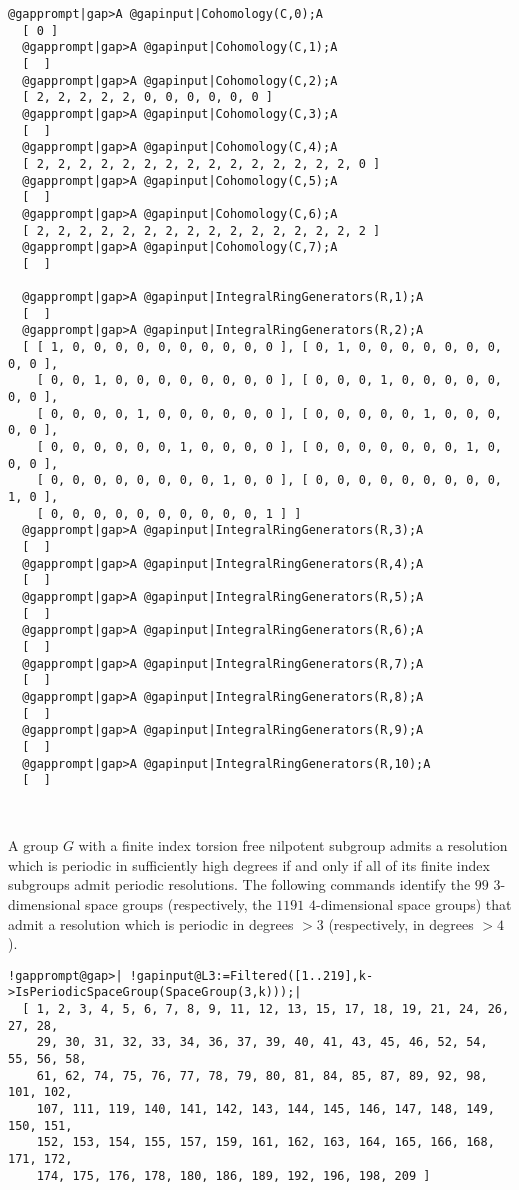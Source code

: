 \documentclass[a4paper,11pt]{report}
\begin{document}
{{\begin{Verbatim}[commandchars=@|A,fontsize=\small,frame=single,label=Example]
  @gapprompt|gap>A @gapinput|Cohomology(C,0);A
  [ 0 ]
  @gapprompt|gap>A @gapinput|Cohomology(C,1);A
  [  ]
  @gapprompt|gap>A @gapinput|Cohomology(C,2);A
  [ 2, 2, 2, 2, 2, 0, 0, 0, 0, 0, 0 ]
  @gapprompt|gap>A @gapinput|Cohomology(C,3);A
  [  ]
  @gapprompt|gap>A @gapinput|Cohomology(C,4);A
  [ 2, 2, 2, 2, 2, 2, 2, 2, 2, 2, 2, 2, 2, 2, 2, 0 ]
  @gapprompt|gap>A @gapinput|Cohomology(C,5);A
  [  ]
  @gapprompt|gap>A @gapinput|Cohomology(C,6);A
  [ 2, 2, 2, 2, 2, 2, 2, 2, 2, 2, 2, 2, 2, 2, 2, 2 ]
  @gapprompt|gap>A @gapinput|Cohomology(C,7);A
  [  ]
  
  @gapprompt|gap>A @gapinput|IntegralRingGenerators(R,1);A
  [  ]
  @gapprompt|gap>A @gapinput|IntegralRingGenerators(R,2);A
  [ [ 1, 0, 0, 0, 0, 0, 0, 0, 0, 0, 0 ], [ 0, 1, 0, 0, 0, 0, 0, 0, 0, 0, 0 ], 
    [ 0, 0, 1, 0, 0, 0, 0, 0, 0, 0, 0 ], [ 0, 0, 0, 1, 0, 0, 0, 0, 0, 0, 0 ], 
    [ 0, 0, 0, 0, 1, 0, 0, 0, 0, 0, 0 ], [ 0, 0, 0, 0, 0, 1, 0, 0, 0, 0, 0 ], 
    [ 0, 0, 0, 0, 0, 0, 1, 0, 0, 0, 0 ], [ 0, 0, 0, 0, 0, 0, 0, 1, 0, 0, 0 ], 
    [ 0, 0, 0, 0, 0, 0, 0, 0, 1, 0, 0 ], [ 0, 0, 0, 0, 0, 0, 0, 0, 0, 1, 0 ], 
    [ 0, 0, 0, 0, 0, 0, 0, 0, 0, 0, 1 ] ]
  @gapprompt|gap>A @gapinput|IntegralRingGenerators(R,3);A
  [  ]
  @gapprompt|gap>A @gapinput|IntegralRingGenerators(R,4);A
  [  ]
  @gapprompt|gap>A @gapinput|IntegralRingGenerators(R,5);A
  [  ]
  @gapprompt|gap>A @gapinput|IntegralRingGenerators(R,6);A
  [  ]
  @gapprompt|gap>A @gapinput|IntegralRingGenerators(R,7);A
  [  ]
  @gapprompt|gap>A @gapinput|IntegralRingGenerators(R,8);A
  [  ]
  @gapprompt|gap>A @gapinput|IntegralRingGenerators(R,9);A
  [  ]
  @gapprompt|gap>A @gapinput|IntegralRingGenerators(R,10);A
  [  ]
  
  
\end{Verbatim}
 

 A group $G$ with a finite index torsion free nilpotent subgroup admits a resolution which
is periodic in sufficiently high degrees if and only if all of its finite
index subgroups admit periodic resolutions. The following commands identify
the $99$ $3$-dimensional space groups (respectively, the $1191$ $4$-dimensional space groups) that admit a resolution which is periodic in
degrees $> 3$ (respectively, in degrees $> 4$). 
\begin{Verbatim}[commandchars=!@|,fontsize=\small,frame=single,label=Example]
  !gapprompt@gap>| !gapinput@L3:=Filtered([1..219],k->IsPeriodicSpaceGroup(SpaceGroup(3,k)));|
  [ 1, 2, 3, 4, 5, 6, 7, 8, 9, 11, 12, 13, 15, 17, 18, 19, 21, 24, 26, 27, 28, 
    29, 30, 31, 32, 33, 34, 36, 37, 39, 40, 41, 43, 45, 46, 52, 54, 55, 56, 58, 
    61, 62, 74, 75, 76, 77, 78, 79, 80, 81, 84, 85, 87, 89, 92, 98, 101, 102, 
    107, 111, 119, 140, 141, 142, 143, 144, 145, 146, 147, 148, 149, 150, 151, 
    152, 153, 154, 155, 157, 159, 161, 162, 163, 164, 165, 166, 168, 171, 172, 
    174, 175, 176, 178, 180, 186, 189, 192, 196, 198, 209 ] 
  

\end{Verbatim}}}
\end{document}
